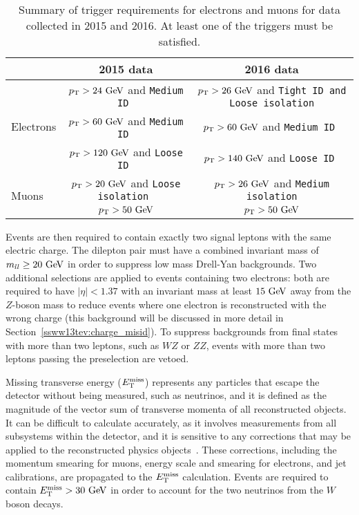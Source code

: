 \begin{table}[htbp]
  \centering
  \begin{tabular}{l | c | c}
    & 2015 data & 2016 data \\
    \hline\hline
    \multirow{3}{*}{Electrons} & $\pt > 24\gev$ and \tt{Medium} ID & $\pt > 26\gev$ and \tt{Tight} ID and \tt{Loose} isolation\\
                               & $\pt > 60\gev$ and \tt{Medium} ID & $\pt > 60\gev$ and \tt{Medium} ID \\
                               & $\pt > 120\gev$ and \tt{Loose} ID & $\pt > 140\gev$ and \tt{Loose} ID \\
    \hline
    \multirow{2}{*}{Muons}     & $\pt > 20\gev$ and \tt{Loose} isolation & $\pt > 26\gev$ and \tt{Medium} isolation\\
                               & $\pt > 50\gev$ & $\pt > 50\gev$ \\
    \hline
  \end{tabular}
  \caption{Summary of trigger requirements for electrons and muons for  data collected in 2015 and 2016.  At least one of the triggers must be satisfied.}
  \label{tab:ssww13tev_triggers}
\end{table}

Events are then required to contain exactly two signal leptons with the same electric charge.
The dilepton pair must have a combined invariant mass of $m_{ll} \ge 20\gev$ in order to suppress low mass Drell-Yan backgrounds.
Two additional selections are applied to events containing two electrons: both are required to have $|\eta| < 1.37$ with an invariant mass at least $15\gev$ away from the $Z$-boson mass to reduce events where one electron is reconstructed with the wrong charge (this background will be discussed in more detail in Section~\ref{ssww13tev:charge_misid}).
To suppress backgrounds from final states with more than two leptons, such as $WZ$ or $ZZ$, events with more than two leptons passing the preselection are vetoed.

Missing transverse energy ($E_{\mathrm{T}}^{\mathrm{miss}}$) represents any particles that escape the detector without being measured, such as neutrinos, and it is defined as the magnitude of the vector sum of transverse momenta of all reconstructed objects.
It can be difficult to calculate accurately, as it involves measurements from all subsystems within the detector, and it is sensitive to any corrections that may be applied to the reconstructed physics objects~\cite{2018.met-13tev}.
These corrections, including the momentum smearing for muons, energy scale and smearing for electrons, and jet calibrations, are propagated to the $E_{\mathrm{T}}^{\mathrm{miss}}$ calculation.
Events are required to contain $\met > 30\gev$ in order to account for the two neutrinos from the $W$ boson decays.

